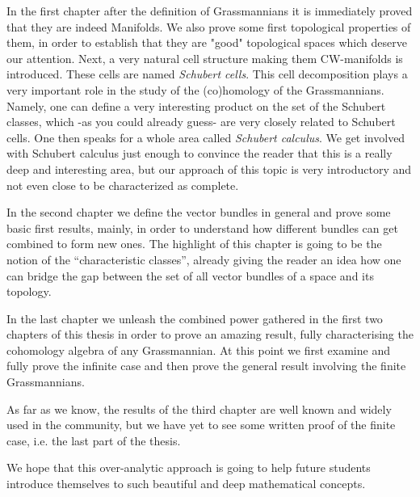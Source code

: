 In the first chapter after the definition of Grassmannians it is immediately proved that they are indeed Manifolds. We also prove some first topological properties of them, in order to establish that they are "good" topological spaces which deserve our attention. Next, a very natural cell structure making them CW-manifolds is introduced. These cells are named \emph{Schubert cells}. This cell decomposition plays a very important role in the study of the (co)homology of the Grassmannians. Namely, one can define a very interesting product on the set of the Schubert classes, which -as you could already guess- are very closely related to Schubert cells. One then speaks for a whole area called \emph{Schubert calculus}. We get involved with Schubert calculus just enough to convince the reader that this is a really deep and interesting area, but our approach of this topic is very introductory and not even close to be characterized as complete.

In the second chapter we define the vector bundles in general and prove some basic first results, mainly, in order to understand how different bundles can get combined to form new ones. The highlight of this chapter is going to be the notion of the ``characteristic classes'', already giving the reader an idea how one can bridge the gap between the set of all vector bundles of a space and its topology.

In the last chapter we unleash the combined power gathered in the first two chapters of this thesis in order to prove an amazing result, fully characterising the cohomology algebra of any Grassmannian. At this point we first examine and fully prove the infinite case and then prove the general result involving the finite Grassmannians.

As far as we know, the results of the third chapter are well known and widely used in the community, but we have yet to see some written proof of the finite case, i.e. the last part of the thesis.

We hope that this over-analytic approach is going to help future students introduce themselves to such beautiful and deep mathematical concepts.
